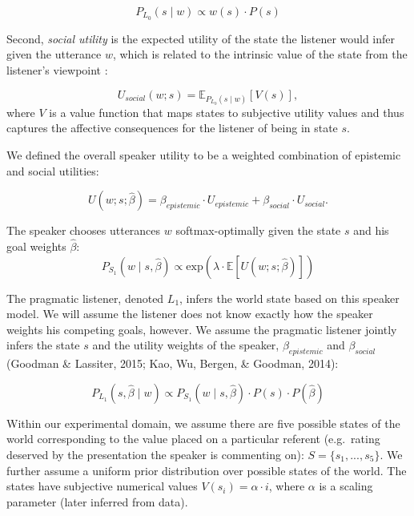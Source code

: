 \documentclass[10pt, letterpaper]{article}
\begin{document}
\[
P_{L_0}(s \mid w)\propto {w}(s) \cdot P(s)
\]

Second, \emph{social utility} is the expected utility of the state the
listener would infer given the utterance \(w\), which is related to the
intrinsic value of the state from the listener's viewpoint :

\[
U_{social}(w; s) = \mathbb{E}_{P_{L_0}(s \mid w)}[V(s)],
\] where \(V\) is a value function that maps states to subjective
utility values and thus captures the affective consequences for the
listener of being in state \(s\).

We defined the overall speaker utility to be a weighted combination of
epistemic and social utilities:

\[
U(w;s;  \hat{\beta}) = \beta_{epistemic}\cdot U_{epistemic} + \beta_{social} \cdot U_{social}.
\]

The speaker chooses utterances \(w\) softmax-optimally given the state
\(s\) and his goal weights \(\hat{\beta}\): \[
P_{S_1}(w \mid s, \hat{\beta}) \propto \mathrm{exp}(\lambda \cdot \mathbb{E}[U(w; s;  \hat{\beta})])\]

The pragmatic listener, denoted \(L_1\), infers the world state based on
this speaker model. We will assume the listener does not know exactly
how the speaker weights his competing goals, however. We assume the
pragmatic listener jointly infers the state \(s\) and the utility
weights of the speaker, \(\beta_{epistemic}\) and \(\beta_{social}\)
(Goodman \& Lassiter, 2015; Kao, Wu, Bergen, \& Goodman, 2014):

\[
P_{L_1}(s,  \hat{\beta} \mid w)\propto P_{S_1}(w \mid s,  \hat{\beta})\cdot P(s) \cdot P( \hat{\beta}) \]

Within our experimental domain, we assume there are five possible states
of the world corresponding to the value placed on a particular referent
(e.g.~rating deserved by the presentation the speaker is commenting on):
\(S = \{s_{1}, ..., s_{5}\}\). We further assume a uniform prior
distribution over possible states of the world. The states have
subjective numerical values \(V(s_{i}) = \alpha \cdot i\), where
\(\alpha\) is a scaling parameter (later inferred from data).
\end{document}
